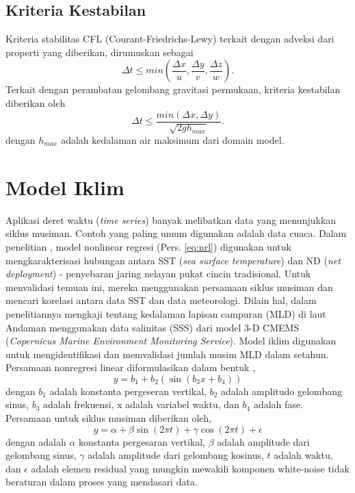 \begin{spacing}{1.5}
\subsection[Kriteria Kestabilan]{Kriteria Kestabilan}
	Kriteria stabilitas CFL (Courant-Friedrichs-Lewy) terkait dengan adveksi dari properti yang diberikan, dirumuskan sebagai
	\begin{equation}
		\Delta t \leq min\left(\frac{\Delta x}{u},\frac{\Delta y}{v},\frac{\Delta z}{w}\right).
	\end{equation}
	Terkait dengan perambatan gelombang gravitasi permukaan, kriteria kestabilan diberikan oleh
	\begin{equation}
		\Delta t \leq \frac{min(\Delta x,\Delta y)}{\sqrt{2gh_{max}}}.
	\end{equation} 
	dengan $h_{max}$ adalah kedalaman air maksimum dari domain model.
\end{spacing}
\vspace{-0.1pc}
\section[Model Iklim]{Model Iklim}
\begin{spacing}{1.5}
	Aplikasi deret waktu (\textit{time series}) banyak melibatkan data yang menunjukkan siklus musiman. Contoh yang paling umum digunakan adalah data cuaca. Dalam penelitian , model nonlinear regresi (Pers. \ref{eq:nrl}) digunakan untuk mengkarakterisasi hubungan antara SST (\textit{sea surface temperature}) dan ND (\textit{net deployment}) - penyebaran jaring nelayan pukat cincin tradisional. Untuk menvalidasi temuan ini, mereka menggunakan persamaan siklus musiman  dan mencari korelasi antara data SST dan data meteorologi. Dilain hal,  dalam penelitiannya mengkaji tentang kedalaman lapisan campuran (MLD) di laut Andaman menggunakan data salinitas (SSS) dari model 3-D CMEMS (\textit{Copernicus Marine Environment Monitoring Service}). Model iklim digunakan untuk mengidentifikasi dan memvalidasi jumlah musim MLD dalam setahun. Persamaan nonregresi linear  diformulasikan dalam bentuk ,
	\begin{equation}\label{eq:nrl}
		y = b_1 + b_2(\sin(b_3x+b_4))
	\end{equation}
	dengan $b_1$ adalah konstanta pergeseran vertikal, $b_2$ adalah amplitudo gelombang sinus, $b_3$ adalah frekuensi, x adalah variabel waktu, dan $b_4$ adalah fase.
	Persamaan untuk siklus musiman  diberikan oleh,
	\begin{equation}
		y = \alpha + \beta \sin(2\pi t)+\gamma \cos(2\pi t) + \epsilon
	\end{equation}
	dengan adalah $\alpha$ konstanta pergesaran vertikal, $\beta$ adalah amplitude dari gelombang sinus, $\gamma$ adalah amplitude dari gelombang kosinus, $t$ adalah waktu, dan $\epsilon$ adalah elemen residual yang mungkin mewakili komponen white-noise tidak beraturan dalam proses yang mendasari data.
\end{spacing}
\vspace{-0.1pc}
